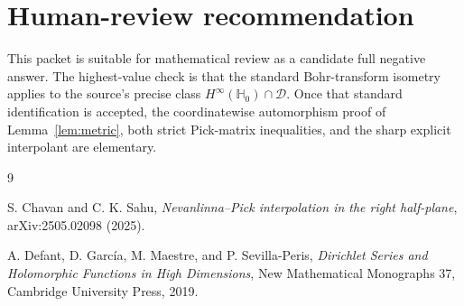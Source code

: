 \documentclass[11pt]{article}
\newcommand{\Hh}{\mathbb H}
\newcommand{\cD}{\mathcal D}
\begin{document}
\section{Human-review recommendation}

This packet is suitable for mathematical review as a candidate full negative
answer.  The highest-value check is that the standard Bohr-transform
isometry applies to the source's precise class
$H^\infty(\Hh_0)\cap\cD$.  Once that standard identification is accepted,
the coordinatewise automorphism proof of Lemma~\ref{lem:metric}, both strict
Pick-matrix inequalities, and the sharp explicit interpolant are elementary.

\begin{thebibliography}{9}

S. Chavan and C. K. Sahu,
\emph{Nevanlinna--Pick interpolation in the right half-plane},
arXiv:2505.02098 (2025).

A. Defant, D. Garc\'ia, M. Maestre, and P. Sevilla-Peris,
\emph{Dirichlet Series and Holomorphic Functions in High Dimensions},
New Mathematical Monographs 37, Cambridge University Press, 2019.

\end{thebibliography}
\end{document}

